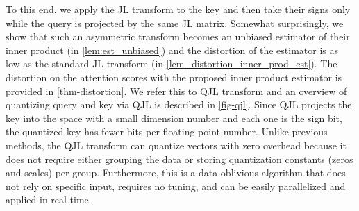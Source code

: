 \documentclass[11pt]{article}
\theoremstyle{plain}
\theoremstyle{definition}
\theoremstyle{remark}
\begin{document}



\iffalse

To this end, we apply the JL transform to the key and then take their signs only while the query is projected by the same JL matrix. 
Somewhat surprisingly, we show that such an asymmetric transform becomes an unbiased estimator of their inner product (in \cref{lem:est_unbiased}) and the distortion of the estimator is as low as the standard JL transform (in \cref{lem_distortion_inner_prod_est}). The distortion on the attention scores with the proposed inner product estimator is provided in \cref{thm-distortion}.
We refer this to QJL transform and an overview of quantizing query and key via QJL is described in \cref{fig-qjl}. Since QJL projects the key into the space with a small dimension number and each one is the sign bit, the quantized key has fewer bits per floating-point number. 
Unlike previous methods, the QJL transform can quantize vectors with zero overhead because it does not require either grouping the data or storing quantization constants (zeros and scales) per group.
Furthermore, this is a data-oblivious algorithm that does not rely on specific input, requires no tuning, and can be easily parallelized and applied in real-time. 


\end{document}
